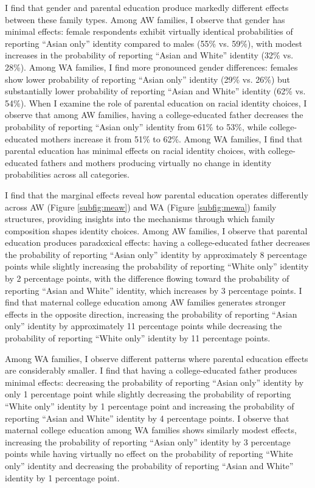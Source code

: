 I find that gender and parental education produce markedly different effects between these family types. Among AW families, I observe that gender has minimal effects: female respondents exhibit virtually identical probabilities of reporting ``Asian only'' identity compared to males (55\% vs. 59\%), with modest increases in the probability of reporting ``Asian and White'' identity (32\% vs. 28\%). Among WA families, I find more pronounced gender differences: females show lower probability of reporting ``Asian only'' identity (29\% vs. 26\%) but substantially lower probability of reporting ``Asian and White'' identity (62\% vs. 54\%). When I examine the role of parental education on racial identity choices, I observe that among AW families, having a college-educated father decreases the probability of reporting ``Asian only'' identity from 61\% to 53\%, while college-educated mothers increase it from 51\% to 62\%. Among WA families, I find that parental education has minimal effects on racial identity choices, with college-educated fathers and mothers producing virtually no change in identity probabilities across all categories.

I find that the marginal effects reveal how parental education operates differently across AW (Figure \ref{subfig:meaw}) and WA (Figure \ref{subfig:mewa})  family structures, providing insights into the mechanisms through which family composition shapes identity choices. Among AW families, I observe that parental education produces paradoxical effects: having a college-educated father decreases the probability of reporting ``Asian only'' identity by approximately 8 percentage points while slightly increasing the probability of reporting ``White only'' identity by 2 percentage points, with the difference flowing toward the probability of reporting ``Asian and White'' identity, which increases by 3 percentage points. I find that maternal college education among AW families generates stronger effects in the opposite direction, increasing the probability of reporting ``Asian only'' identity by approximately 11 percentage points while decreasing the probability of reporting ``White only'' identity by 11 percentage points.

Among WA families, I observe different patterns where parental education effects are considerably smaller. I find that having a college-educated father produces minimal effects: decreasing the probability of reporting ``Asian only'' identity by only 1 percentage point while slightly decreasing the probability of reporting ``White only'' identity by 1 percentage point and increasing the probability of reporting ``Asian and White'' identity by 4 percentage points. I observe that maternal college education among WA families shows similarly modest effects, increasing the probability of reporting ``Asian only'' identity by 3 percentage points while having virtually no effect on the probability of reporting ``White only'' identity and decreasing the probability of reporting ``Asian and White'' identity by 1 percentage point.

